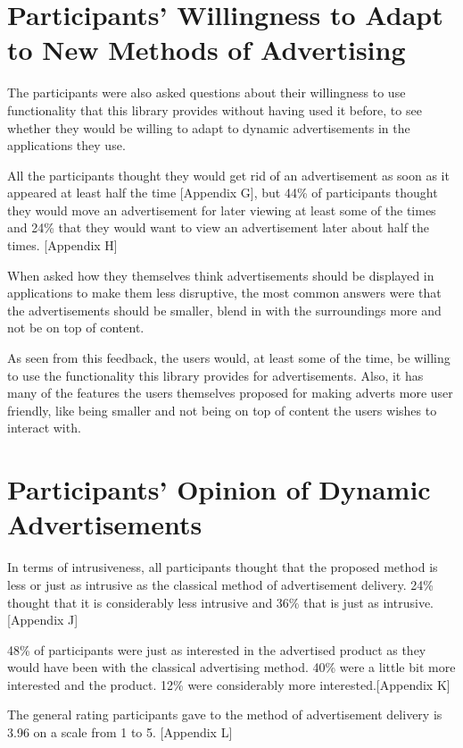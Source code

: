 \section{Participants' Willingness to Adapt to New Methods of Advertising}

The participants were also asked questions about their willingness to use functionality that this library provides without having used it before, to see whether they would be willing to adapt to dynamic advertisements in the applications they use.

All the participants thought they would get rid of an advertisement as soon as it appeared at least half the time [Appendix G], but 44\% of participants thought they would move an advertisement for later viewing at least some of the times and 24\% that they would want to view an advertisement later about half the times. [Appendix H]

When asked how they themselves think advertisements should be displayed in applications to make them less disruptive, the most common answers were that the advertisements should be smaller, blend in with the surroundings more and not be on top of content.

As seen from this feedback, the users would, at least some of the time, be willing to use the functionality this library provides for advertisements. Also, it has many of the features the users themselves proposed for making adverts more user friendly, like being smaller and not being on top of content the users wishes to interact with.

\section{Participants' Opinion of Dynamic Advertisements}

In terms of intrusiveness, all participants thought that the proposed method is less or just as intrusive as the classical method of advertisement delivery. 24\% thought that it is considerably less intrusive and 36\% that is just as intrusive. [Appendix J]

48\% of participants were just as interested in the advertised product as they would have been with the classical advertising method. 40\% were a little bit more interested and the product. 12\% were considerably more interested.[Appendix K]

The general rating participants gave to the method of advertisement delivery is 3.96 on a scale from 1 to 5. [Appendix L]

